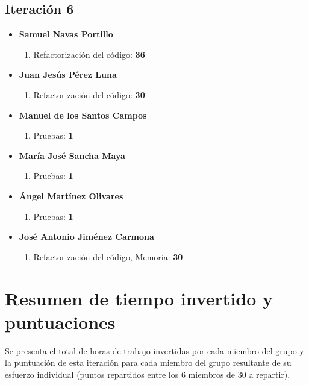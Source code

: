\documentclass[11 pt]{book}
\begin{document}
	\subsection*{Iteración 6}
		    \begin{itemize}
			    \item \textbf {Samuel Navas Portillo}
				    \begin{enumerate}
					    \item Refactorización del código: \textbf{36}
				    \end{enumerate}
			    \item \textbf {Juan Jesús Pérez Luna}
				    \begin{enumerate}
					    \item Refactorización del código: \textbf{30}
				    \end{enumerate}
			    \item \textbf {Manuel de los Santos Campos}
				    \begin{enumerate}
					    \item Pruebas: \textbf{1}
				    \end{enumerate}
			    \item \textbf {María José Sancha Maya}
				    \begin{enumerate}
					    \item Pruebas: \textbf{1}
				    \end{enumerate}
			    \item \textbf {Ángel Martínez Olivares}
				    \begin{enumerate}
					    \item Pruebas: \textbf{1}
				    \end{enumerate}
			    \item \textbf {José Antonio Jiménez Carmona}
				    \begin{enumerate}
					    \item Refactorización del código, Memoria: \textbf{30}
				    \end{enumerate}
		    \end{itemize}
	\section{Resumen de tiempo invertido y puntuaciones}
		Se presenta el total de horas de trabajo invertidas por cada miembro del grupo y la puntuación de esta iteración para cada miembro del grupo resultante de su esfuerzo individual (puntos repartidos entre los 6 miembros de 30 a repartir).\\
			
\end{document}
